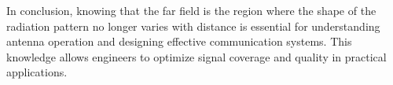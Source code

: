 In conclusion, knowing that the far field is the region where the shape of the radiation pattern no longer varies with distance is essential for understanding antenna operation and designing effective communication systems. This knowledge allows engineers to optimize signal coverage and quality in practical applications.

